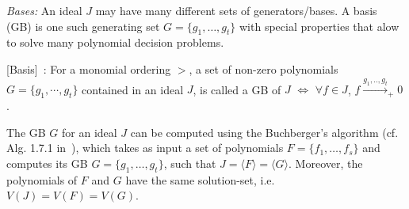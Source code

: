 

{\it \Grobner Bases:} An ideal $J$ may have many different sets of 
generators/bases. %
A \Grobner basis (GB) is one such generating set $G=\{g_1, \dots,
g_t\}$ with special properties that alow to solve many polynomial
decision problems.

\begin{Definition}
\label{def:gb}
{[\Grobner Basis]}~\cite{gb_book}: 
For a monomial ordering $>$, a set of non-zero polynomials $G =
\{g_1,\cdots,g_t\}$ contained in an ideal $J$, is called a
GB of $J$ $\iff$
$\forall f \in J$, $f\xrightarrow{g_1,..,g_t}_+0$. 
\end{Definition}
The GB $G$ for an ideal $J$ can be computed using the Buchberger's
algorithm  %
(cf. Alg. 1.7.1 in~\cite{gb_book}), which
takes as input a set of polynomials $F = \{f_1,\dots, f_s\}$ and
computes its GB $G = \{g_1,\dots,g_t\}$, such that $J = \langle
F\rangle = \langle G\rangle$. Moreover, the polynomials of $F$ and $G$
have the same solution-set, i.e. $V(J) = V(F) = V(G)$. 



